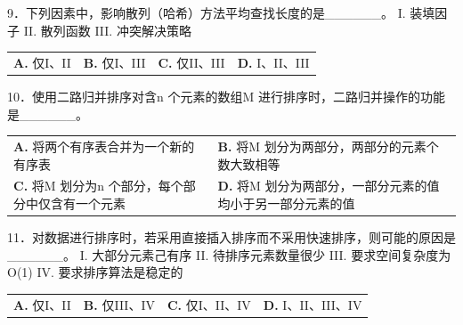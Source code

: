 \documentclass[UTF8,11pt]{ctexart}
\begin{document}
9．下列因素中，影响散列（哈希）方法平均查找长度的是\_\_\_\_\_\_。 I. 装填因子 II. 散列函数 III. 冲突解决策略


\begin{center}\begin{tabular}{>{\raggedright\arraybackslash}p{\dimexpr(\linewidth-8\tabcolsep)/4\relax}>{\raggedright\arraybackslash}p{\dimexpr(\linewidth-8\tabcolsep)/4\relax}>{\raggedright\arraybackslash}p{\dimexpr(\linewidth-8\tabcolsep)/4\relax}>{\raggedright\arraybackslash}p{\dimexpr(\linewidth-8\tabcolsep)/4\relax}}
\textbf{A.} 仅I、II & \textbf{B.} 仅I、III & \textbf{C.} 仅II、III & \textbf{D.} I、II、III\\[.35em]\end{tabular}\end{center}

10．使用二路归并排序对含n 个元素的数组M 进行排序时，二路归并操作的功能是\_\_\_\_\_\_。


\begin{center}\begin{tabular}{>{\raggedright\arraybackslash}p{\dimexpr(\linewidth-4\tabcolsep)/2\relax}>{\raggedright\arraybackslash}p{\dimexpr(\linewidth-4\tabcolsep)/2\relax}}
\textbf{A.} 将两个有序表合并为一个新的有序表 & \textbf{B.} 将M 划分为两部分，两部分的元素个数大致相等\\[.35em]
\textbf{C.} 将M 划分为n 个部分，每个部分中仅含有一个元素 & \textbf{D.} 将M 划分为两部分，一部分元素的值均小于另一部分元素的值\\[.35em]\end{tabular}\end{center}

11．对数据进行排序时，若采用直接插入排序而不采用快速排序，则可能的原因是\_\_\_\_\_\_。 I. 大部分元素己有序 II. 待排序元素数量很少 III. 要求空间复杂度为O(1) IV. 要求排序算法是稳定的


\begin{center}\begin{tabular}{>{\raggedright\arraybackslash}p{\dimexpr(\linewidth-8\tabcolsep)/4\relax}>{\raggedright\arraybackslash}p{\dimexpr(\linewidth-8\tabcolsep)/4\relax}>{\raggedright\arraybackslash}p{\dimexpr(\linewidth-8\tabcolsep)/4\relax}>{\raggedright\arraybackslash}p{\dimexpr(\linewidth-8\tabcolsep)/4\relax}}
\textbf{A.} 仅I、II & \textbf{B.} 仅III、IV & \textbf{C.} 仅I、II、IV & \textbf{D.} I、II、III、IV\\[.35em]\end{tabular}\end{center}
\end{document}
